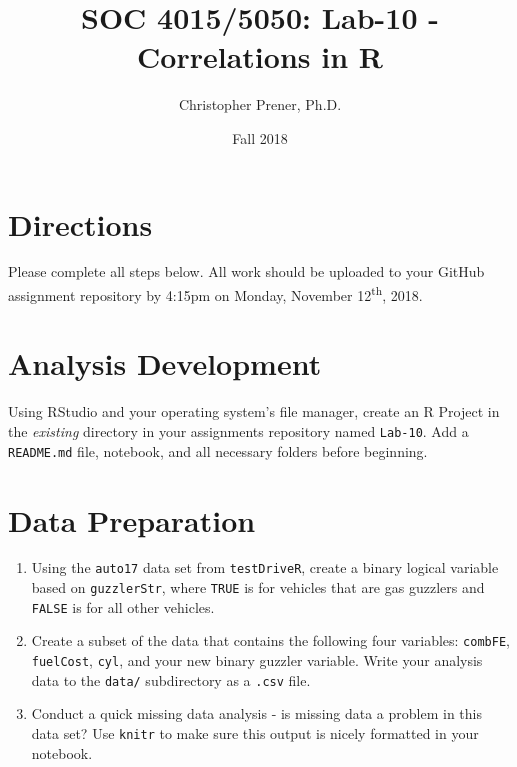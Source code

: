 \documentclass{tufte-handout}
\title{SOC 4015/5050: Lab-10 - Correlations in R}
\author{Christopher Prener, Ph.D.}
\date{Fall 2018}
\begin{document}

\maketitle %


\vspace{5mm}
\section{Directions}
Please complete all steps below. All work should be uploaded to your GitHub assignment repository by 4:15pm on Monday, November 12\textsuperscript{th}, 2018. 

\vspace{5mm}
\section{Analysis Development}
Using RStudio and your operating system's file manager, create an R Project in the \textit{existing} directory in your assignments repository named \texttt{Lab-10}. Add a \texttt{README.md} file, notebook, and all necessary folders before beginning.

\vspace{5mm}
\section{Data Preparation}
\begin{enumerate}
\item Using the \texttt{auto17} data set from \texttt{testDriveR}, create a binary logical variable based on \texttt{guzzlerStr}, where \texttt{TRUE} is for vehicles that are gas guzzlers and \texttt{FALSE} is for all other vehicles.
\item Create a subset of the data that contains the following four variables: \texttt{combFE}, \texttt{fuelCost}, \texttt{cyl}, and your new binary guzzler variable. Write your analysis data to the \texttt{data/} subdirectory as a \texttt{.csv} file.
\item Conduct a quick missing data analysis - is missing data a problem in this data set? Use \texttt{knitr} to make sure this output is nicely formatted in your notebook.
\end{enumerate}
\end{document}
